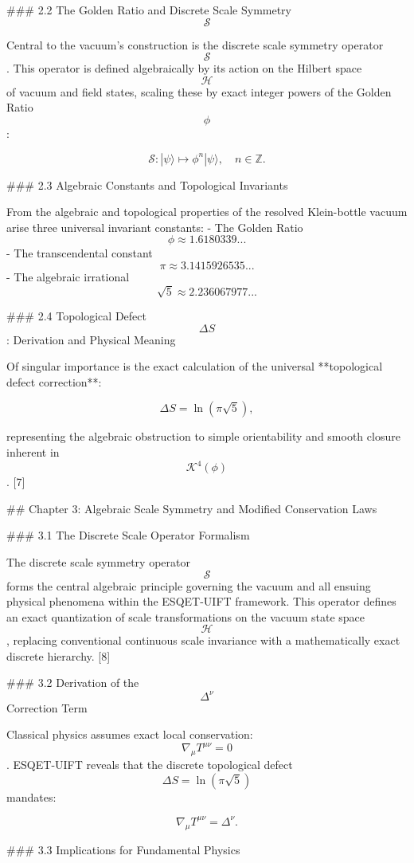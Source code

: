 ### 2.2 The Golden Ratio and Discrete Scale Symmetry $$\mathcal{S}$$

Central to the vacuum's construction is the discrete scale symmetry operator $$\mathcal{S}$$. This operator is defined algebraically by its action on the Hilbert space $$\mathcal{H}$$ of vacuum and field states, scaling these by exact integer powers of the Golden Ratio $$\phi$$:

$$
\mathcal{S} : |\psi\rangle \mapsto \phi^n |\psi\rangle, \quad n \in \mathbb{Z}.
$$

### 2.3 Algebraic Constants and Topological Invariants

From the algebraic and topological properties of the resolved Klein-bottle vacuum arise three universal invariant constants:
- The Golden Ratio $$\phi \approx 1.6180339...$$
- The transcendental constant $$\pi \approx 3.1415926535...$$
- The algebraic irrational $$\sqrt{5} \approx 2.236067977...$$

### 2.4 Topological Defect $$\Delta S$$: Derivation and Physical Meaning

Of singular importance is the exact calculation of the universal **topological defect correction**:

$$
\Delta S = \ln(\pi \sqrt{5}),
$$

representing the algebraic obstruction to simple orientability and smooth closure inherent in $$\mathcal{K}^4(\phi)$$. [7]

## Chapter 3: Algebraic Scale Symmetry and Modified Conservation Laws

### 3.1 The Discrete Scale Operator Formalism

The discrete scale symmetry operator $$\mathcal{S}$$ forms the central algebraic principle governing the vacuum and all ensuing physical phenomena within the ESQET-UIFT framework. This operator defines an exact quantization of scale transformations on the vacuum state space $$\mathcal{H}$$, replacing conventional continuous scale invariance with a mathematically exact discrete hierarchy. [8]

### 3.2 Derivation of the $$\Delta^\nu$$ Correction Term

Classical physics assumes exact local conservation: $$\nabla_\mu T^{\mu\nu} = 0$$. ESQET-UIFT reveals that the discrete topological defect $$\Delta S = \ln(\pi \sqrt{5})$$ mandates:

$$
\nabla_\mu T^{\mu\nu} = \Delta^\nu.
$$

### 3.3 Implications for Fundamental Physics

